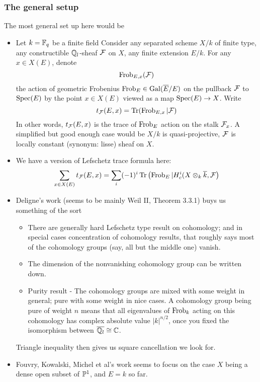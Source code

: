 \subsubsection{The general setup}
The most general set up here would be 
\begin{itemize}
    \item Let $k = \mathbb{F}_q$ be a finite field Consider any separated scheme $X/k$ of finite type, any constructible $\mathbb{Q}_l$-sheaf $\mathcal{F}$ on $X$, any finite extension $E/k$. For any $x \in X(E)$, denote 
    \[
    \operatorname{Frob}_{E,x} (\mathcal{F})
    \]
    the action of geometric Frobenius $\operatorname{Frob}_E \in \operatorname{Gal}(\overline{E}/E)$ on the pullback $\mathcal{F}$ to $\operatorname{Spec}(E)$ by the point $x \in X(E)$ viewed as a map $\operatorname{Spec} (E) \to X$. Write
    \[
    t_{\mathcal{F}}(E,x) = \operatorname{Tr}(\operatorname{Frob}_{E,x}|\mathcal{F})
    \]
    In other words, $t_{\mathcal{F}}(E,x)$ is the trace of $\operatorname{Frob}_E$ action on the stalk $\mathcal{F}_x$.
    A simplified but good enough case would be $X/k$ is quasi-projective, $\mathcal{F}$ is locally constant (synonym: lisse) sheaf on $X$.
    \item We have a version of Lefschetz trace formula here:
    \[
    \sum_{x \in X(E)} t_{\mathcal{F}}(E,x) = \sum_i (-1)^i \operatorname{Tr}\left(\operatorname{Frob}_E | H_c^i(X \otimes_k \overline{k}, \mathcal{F}\right)
    \]
    \item Deligne's work (seems to be mainly Weil II, Theorem 3.3.1) buys us something of the sort
    \begin{itemize}
        \item There are generally hard Lefschetz type result on cohomology; and in special cases concentration of cohomology results, that roughly says most of the cohomology groups (say, all but the middle one) vanish.
        \item The dimension of the nonvanishing cohomology group can be written down.
        \item Purity result - The cohomology groups are mixed with some weight in general; pure with some weight in nice cases. A cohomology group being pure of weight $n$ means that all eigenvalues of $\operatorname{Frob}_k$ acting on this cohomology has complex absolute value $|k|^{n/2}$, once you fixed the isomorphism between $\overline{\mathbb{Q}_l} \cong \mathbb{C}$. 
    \end{itemize}
    Triangle inequality then gives us square cancellation we look for.
    \item Fouvry, Kowalski, Michel et al's work seems to focus on the case $X$ being a dense open subset of $\mathbb{P}^1$, and $E = k$ so far.
    \end{itemize}

